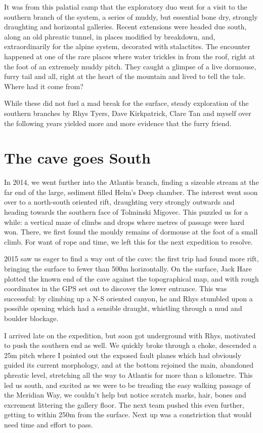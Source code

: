 It was from this palatial camp that the exploratory duo went for a visit to the southern branch of the system, a series of muddy, but essential bone dry, strongly draughting and horizontal galleries. Recent extensions were headed due south, along an old phreatic tunnel, in places modified by breakdown, and, extraordinarily for the alpine system, decorated with stalactites. The encounter happened at one of the rare places where water trickles in from the roof, right at the foot of an extremely muddy pitch. They caught a glimpse of a live dormouse, furry tail and all, right at the heart of the mountain and lived to tell the tale. Where had it come from? 

While these did not fuel a mad break for the surface, steady exploration of the southern branches by Rhys Tyers, Dave Kirkpatrick, Clare Tan and myself over the following years yielded more and more evidence that the furry friend.

\section{The cave goes South}

In 2014, we went further into the Atlantis branch, finding a sizeable stream at the far end of the large, sediment filled Helm’s Deep chamber. The interest went soon over to a north-south oriented rift, draughting very strongly outwards and heading towards the southern face of Tolminski Migovec. This puzzled us for a while: a vertical maze of climbs and drops where metres of passage were hard won. There, we first found the mouldy remains of dormouse at the foot of a small climb. For want of rope and time, we left this for the next expedition to resolve.

2015 saw us eager to find a way out of the cave: the first trip had found more rift, bringing the surface to fewer than 500m horizontally. On the surface, Jack Hare plotted the known end of the cave against the topographical map, and with rough coordinates in the GPS set out to discover the lower entrance. This was successful: by climbing up a N-S oriented canyon, he and Rhys stumbled upon a possible opening which had a sensible draught, whistling through a mud and boulder blockage. 

I arrived late on the expedition, but soon got underground with Rhys, motivated to push the southern end as well. We quickly broke through a choke, descended a 25m pitch where I pointed out the exposed fault planes which had obviously guided its current morphology, and at the bottom rejoined the main, abandoned phreatic level, stretching all the way to Atlantis for more than a kilometre. This led us south, and excited as we were to be treading the easy walking passage of the Meridian Way, we couldn’t help but notice scratch marks, hair, bones and excrement littering the gallery floor. The next team pushed this even further, getting to within 250m from the surface. Next up was a constriction that would need time and effort to pass.

